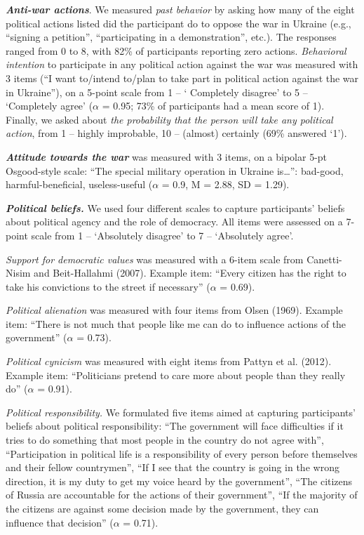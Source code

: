 \documentclass[
]{article}
\begin{document}
\textbf{\emph{Anti-war actions}}. We measured \emph{past behavior} by asking how many of the eight political actions listed did the participant do to oppose the war in Ukraine (e.g., ``signing a petition'', ``participating in a demonstration'', etc.). The responses ranged from 0 to 8, with 82\% of participants reporting zero actions. \emph{Behavioral intention} to participate in any political action against the war was measured with 3 items (``I want to/intend to/plan to take part in political action against the war in Ukraine''), on a 5-point scale from 1 -- ` Completely disagree' to 5 -- `Completely agree' (\(\alpha\) = 0.95; 73\% of participants had a mean score of 1). Finally, we asked about \emph{the probability that the person will take any political action}, from 1 -- highly improbable, 10 -- (almost) certainly (69\% answered `1').

\textbf{\emph{Attitude towards the war}} was measured with 3 items, on a bipolar 5-pt Osgood-style scale: ``The special military operation in Ukraine is\ldots{}'': bad-good, harmful-beneficial, useless-useful (\(\alpha\) = 0.9, M = 2.88, SD = 1.29).

\textbf{\emph{Political beliefs.}} We used four different scales to capture participants' beliefs about political agency and the role of democracy. All items were assessed on a 7-point scale from 1 -- `Absolutely disagree' to 7 -- `Absolutely agree'.

\emph{Support for democratic values} was measured with a 6-item scale from Canetti-Nisim and Beit-Hallahmi (2007). Example item: ``Every citizen has the right to take his convictions to the street if necessary'' (\(\alpha\) = 0.69).

\emph{Political alienation} was measured with four items from Olsen (1969). Example item: ``There is not much that people like me can do to influence actions of the government'' (\(\alpha\) = 0.73).

\emph{Political cynicism} was measured with eight items from Pattyn et al. (2012). Example item: ``Politicians pretend to care more about people than they really do'' (\(\alpha\) = 0.91).

\emph{Political responsibility.} We formulated five items aimed at capturing participants' beliefs about political responsibility: ``The government will face difficulties if it tries to do something that most people in the country do not agree with'', ``Participation in political life is a responsibility of every person before themselves and their fellow countrymen'', ``If I see that the country is going in the wrong direction, it is my duty to get my voice heard by the government'', ``The citizens of Russia are accountable for the actions of their government'', ``If the majority of the citizens are against some decision made by the government, they can influence that decision'' (\(\alpha\) = 0.71).
\end{document}

